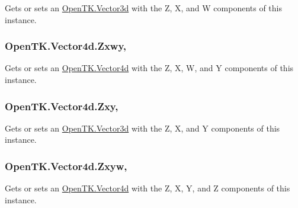Gets or sets an \hyperlink{struct_open_t_k_1_1_vector3d}{Open\-T\-K.\-Vector3d} with the Z, X, and W components of this instance. 

\hypertarget{struct_open_t_k_1_1_vector4d_a3ffdae4b4eeea27e94597d6293f704a4}{
\subsubsection[{Zxwy}]{ Open\-T\-K.\-Vector4d.\-Zxwy\hspace{0.3cm}{\ttfamily [get]}, {\ttfamily [set]}}}\label{struct_open_t_k_1_1_vector4d_a3ffdae4b4eeea27e94597d6293f704a4}


Gets or sets an \hyperlink{struct_open_t_k_1_1_vector4d}{Open\-T\-K.\-Vector4d} with the Z, X, W, and Y components of this instance. 

\hypertarget{struct_open_t_k_1_1_vector4d_a6073000686398b5e623109eff3c96719}{
\subsubsection[{Zxy}]{ Open\-T\-K.\-Vector4d.\-Zxy\hspace{0.3cm}{\ttfamily [get]}, {\ttfamily [set]}}}\label{struct_open_t_k_1_1_vector4d_a6073000686398b5e623109eff3c96719}


Gets or sets an \hyperlink{struct_open_t_k_1_1_vector3d}{Open\-T\-K.\-Vector3d} with the Z, X, and Y components of this instance. 

\hypertarget{struct_open_t_k_1_1_vector4d_a2380266e1d9836e3a31f5e04a33f78f5}{
\subsubsection[{Zxyw}]{ Open\-T\-K.\-Vector4d.\-Zxyw\hspace{0.3cm}{\ttfamily [get]}, {\ttfamily [set]}}}\label{struct_open_t_k_1_1_vector4d_a2380266e1d9836e3a31f5e04a33f78f5}


Gets or sets an \hyperlink{struct_open_t_k_1_1_vector4d}{Open\-T\-K.\-Vector4d} with the Z, X, Y, and Z components of this instance. 

